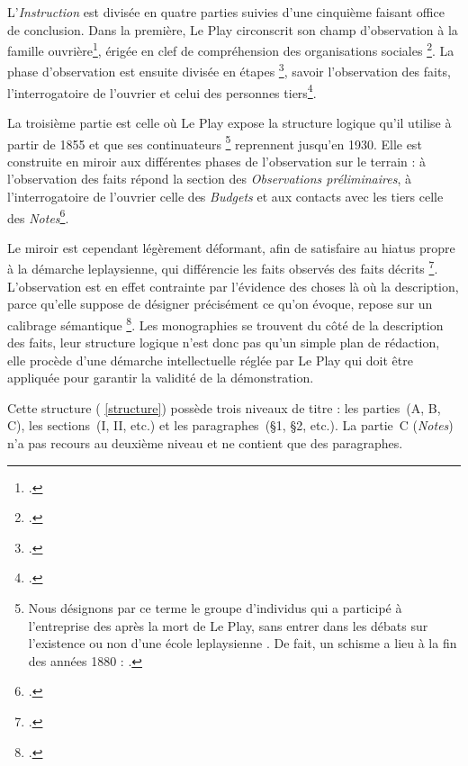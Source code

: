 L'\textit{Instruction} est divisée en quatre parties suivies d'une cinquième faisant office de conclusion. Dans la première, Le Play circonscrit son champ d'observation à la famille ouvrière\footcite[I., \og Remarques préliminaires sur l'étude des faits sociaux et sur la méthode des monographies de familles \fg{}, p. 15-16]{instruction62}, érigée en \og clef de compréhension des organisations sociales \fg{}\footcite[p. 15]{savoye2}. La phase d'observation est ensuite divisée en étapes \footcite[II., \og Règles à suivre pour procéder à l'observation des faits sociaux \fg{}, p. 17-19]{instruction62}, savoir l'observation des faits, l'interrogatoire de l'ouvrier et celui des personnes tiers\footcite[p. 16]{savoye2}.

La troisième partie est celle où Le Play expose la structure logique qu'il utilise à partir de 1855 et que ses \og continuateurs \fg{}\footnote{Nous désignons par ce terme le groupe d'individus qui a participé à l'entreprise des \odm{} après la mort de Le Play, sans entrer dans les débats sur l'existence ou non d'une \og école leplaysienne \fg{}. De fait, un schisme a lieu à la fin des années 1880 : \cite{savoyecontinuateurs}.} reprennent jusqu'en 1930. Elle est construite en miroir aux différentes phases de l'observation sur le terrain : à l'observation des faits répond la section des\textit{ Observations préliminaires}, à l'interrogatoire de l'ouvrier celle des \textit{Budgets} et aux contacts avec les tiers celle des \textit{Notes}\footcite[III., \og Précis des faits à observer --- Établissement des budgets \fg{}, p. 20-31]{instruction62}.

Le miroir est cependant légèrement déformant, afin de satisfaire au \og hiatus \fg{} propre à la démarche leplaysienne, qui différencie les \og faits observés \fg{} des \og faits décrits \fg\footcite[p. 87]{baciocchi2}. L'observation est en effet \og contrainte par l'évidence des choses \fg{} là où la description, \og parce qu'elle suppose de désigner précisément ce qu'on évoque, repose sur un calibrage sémantique \fg{}\footcite[p. 87-88]{baciocchi2}. Les monographies se trouvent du côté de la description des faits, leur structure logique n'est donc pas qu'un simple plan de rédaction, elle procède d'une démarche intellectuelle réglée par Le Play qui doit être appliquée pour garantir la validité de la démonstration.

Cette structure (\ann{} \ref{structure}) possède trois niveaux de titre : les parties~(A, B, C), les sections~(I, II, etc.) et les paragraphes~(§1, §2, etc.). La partie~C (\textit{Notes}) n'a pas recours au deuxième niveau et ne contient que des paragraphes.

